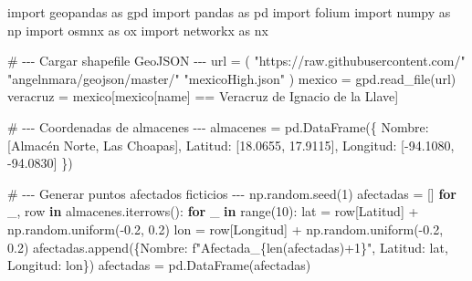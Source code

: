 \documentclass[
  spanish,
  us-letterpaper,
]{scrreprt}
\newenvironment{Shaded}{\begin{snugshade}}{\end{snugshade}}
\newcommand{\BuiltInTok}[1]{\textcolor[rgb]{0.00,0.23,0.31}{#1}}
\newcommand{\CommentTok}[1]{\textcolor[rgb]{0.37,0.37,0.37}{#1}}
\newcommand{\ControlFlowTok}[1]{\textcolor[rgb]{0.00,0.23,0.31}{\textbf{#1}}}
\newcommand{\DecValTok}[1]{\textcolor[rgb]{0.68,0.00,0.00}{#1}}
\newcommand{\FloatTok}[1]{\textcolor[rgb]{0.68,0.00,0.00}{#1}}
\newcommand{\ImportTok}[1]{\textcolor[rgb]{0.00,0.46,0.62}{#1}}
\newcommand{\KeywordTok}[1]{\textcolor[rgb]{0.00,0.23,0.31}{\textbf{#1}}}
\newcommand{\NormalTok}[1]{\textcolor[rgb]{0.00,0.23,0.31}{#1}}
\newcommand{\OperatorTok}[1]{\textcolor[rgb]{0.37,0.37,0.37}{#1}}
\newcommand{\SpecialCharTok}[1]{\textcolor[rgb]{0.37,0.37,0.37}{#1}}
\newcommand{\SpecialStringTok}[1]{\textcolor[rgb]{0.13,0.47,0.30}{#1}}
\newcommand{\StringTok}[1]{\textcolor[rgb]{0.13,0.47,0.30}{#1}}
\numberwithin{equation}{section}
\begin{document}
\begin{Shaded}
\begin{Highlighting}[]
\ImportTok{import}\NormalTok{ geopandas }\ImportTok{as}\NormalTok{ gpd}
\ImportTok{import}\NormalTok{ pandas }\ImportTok{as}\NormalTok{ pd}
\ImportTok{import}\NormalTok{ folium}
\ImportTok{import}\NormalTok{ numpy }\ImportTok{as}\NormalTok{ np}
\ImportTok{import}\NormalTok{ osmnx }\ImportTok{as}\NormalTok{ ox}
\ImportTok{import}\NormalTok{ networkx }\ImportTok{as}\NormalTok{ nx}

\CommentTok{\# {-}{-}{-} Cargar shapefile GeoJSON {-}{-}{-}}
\NormalTok{url }\OperatorTok{=}\NormalTok{ (}
    \StringTok{"https://raw.githubusercontent.com/"}
    \StringTok{"angelnmara/geojson/master/"}
    \StringTok{"mexicoHigh.json"}
\NormalTok{)}
\NormalTok{mexico }\OperatorTok{=}\NormalTok{ gpd.read\_file(url)}
\NormalTok{veracruz }\OperatorTok{=}\NormalTok{ mexico[mexico[}\StringTok{\textquotesingle{}name\textquotesingle{}}\NormalTok{] }\OperatorTok{==} \StringTok{\textquotesingle{}Veracruz de Ignacio de la Llave\textquotesingle{}}\NormalTok{]}

\CommentTok{\# {-}{-}{-} Coordenadas de almacenes {-}{-}{-}}
\NormalTok{almacenes }\OperatorTok{=}\NormalTok{ pd.DataFrame(\{}
    \StringTok{\textquotesingle{}Nombre\textquotesingle{}}\NormalTok{: [}\StringTok{\textquotesingle{}Almacén Norte\textquotesingle{}}\NormalTok{, }\StringTok{\textquotesingle{}Las Choapas\textquotesingle{}}\NormalTok{],}
    \StringTok{\textquotesingle{}Latitud\textquotesingle{}}\NormalTok{: [}\FloatTok{18.0655}\NormalTok{, }\FloatTok{17.9115}\NormalTok{],}
    \StringTok{\textquotesingle{}Longitud\textquotesingle{}}\NormalTok{: [}\OperatorTok{{-}}\FloatTok{94.1080}\NormalTok{, }\OperatorTok{{-}}\FloatTok{94.0830}\NormalTok{]}
\NormalTok{\})}

\CommentTok{\# {-}{-}{-} Generar puntos afectados ficticios {-}{-}{-}}
\NormalTok{np.random.seed(}\DecValTok{1}\NormalTok{)}
\NormalTok{afectadas }\OperatorTok{=}\NormalTok{ []}
\ControlFlowTok{for}\NormalTok{ \_, row }\KeywordTok{in}\NormalTok{ almacenes.iterrows():}
    \ControlFlowTok{for}\NormalTok{ \_ }\KeywordTok{in} \BuiltInTok{range}\NormalTok{(}\DecValTok{10}\NormalTok{):}
\NormalTok{        lat }\OperatorTok{=}\NormalTok{ row[}\StringTok{\textquotesingle{}Latitud\textquotesingle{}}\NormalTok{] }\OperatorTok{+}\NormalTok{ np.random.uniform(}\OperatorTok{{-}}\FloatTok{0.2}\NormalTok{, }\FloatTok{0.2}\NormalTok{)}
\NormalTok{        lon }\OperatorTok{=}\NormalTok{ row[}\StringTok{\textquotesingle{}Longitud\textquotesingle{}}\NormalTok{] }\OperatorTok{+}\NormalTok{ np.random.uniform(}\OperatorTok{{-}}\FloatTok{0.2}\NormalTok{, }\FloatTok{0.2}\NormalTok{)}
\NormalTok{        afectadas.append(\{}\StringTok{\textquotesingle{}Nombre\textquotesingle{}}\NormalTok{: }\SpecialStringTok{f"Afectada\_}\SpecialCharTok{\{}\BuiltInTok{len}\NormalTok{(afectadas)}\OperatorTok{+}\DecValTok{1}\SpecialCharTok{\}}\SpecialStringTok{"}\NormalTok{,}
         \StringTok{\textquotesingle{}Latitud\textquotesingle{}}\NormalTok{: lat, }\StringTok{\textquotesingle{}Longitud\textquotesingle{}}\NormalTok{: lon\})}
\NormalTok{afectadas }\OperatorTok{=}\NormalTok{ pd.DataFrame(afectadas)}


\end{Highlighting}
\end{Shaded}
\end{document}
